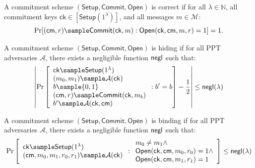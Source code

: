 \begin{definition}[Correctness]
A commitment scheme $(\mathsf{Setup}, \mathsf{Commit}, \mathsf{Open})$ is correct if for all $\lambda \in \mathbb{N}$, all commitment keys $\mathsf{ck} \in [\mathsf{Setup}(1^\lambda)]$, and all messages $m \in \mathcal{M}$:
$$\Pr[(\mathsf{cm}, r) \sample \mathsf{Commit}(\mathsf{ck}, m) : \mathsf{Open}(\mathsf{ck}, \mathsf{cm}, m, r) = 1] = 1.$$
\end{definition}

\begin{definition}[Hiding]
A commitment scheme $(\mathsf{Setup}, \mathsf{Commit}, \mathsf{Open})$ is hiding if for all PPT adversaries $\mathcal{A}$, there exists a negligible function $\mathsf{negl}$ such that:
$$\left|\Pr\left[\begin{array}{l}
    \mathsf{ck} \sample \mathsf{Setup}(1^\lambda) \\
    (m_0, m_1) \sample \mathcal{A}(\mathsf{ck}) \\
    b \sample \{0,1\} \\
    (\mathsf{cm}, r) \sample \mathsf{Commit}(\mathsf{ck}, m_b) \\
    b' \sample \mathcal{A}(\mathsf{ck}, \mathsf{cm})
\end{array} : b' = b\right] - \frac{1}{2}\right| \leq \negl(\lambda)$$
\end{definition}

\begin{definition}[Binding]
A commitment scheme $(\mathsf{Setup}, \mathsf{Commit}, \mathsf{Open})$ is binding if for all PPT adversaries $\mathcal{A}$, there exists a negligible function $\mathsf{negl}$ such that:
$$\Pr\left[\begin{array}{l}
    \mathsf{ck} \sample \mathsf{Setup}(1^\lambda) \\
    (\mathsf{cm}, m_0, m_1, r_0, r_1) \sample \mathcal{A}(\mathsf{ck})
\end{array} : \begin{array}{l}
    m_0 \neq m_1 \land \\
    \mathsf{Open}(\mathsf{ck}, \mathsf{cm}, m_0, r_0) = 1 \land \\
    \mathsf{Open}(\mathsf{ck}, \mathsf{cm}, m_1, r_1) = 1
\end{array}\right] \leq \negl(\lambda)$$
\end{definition}

